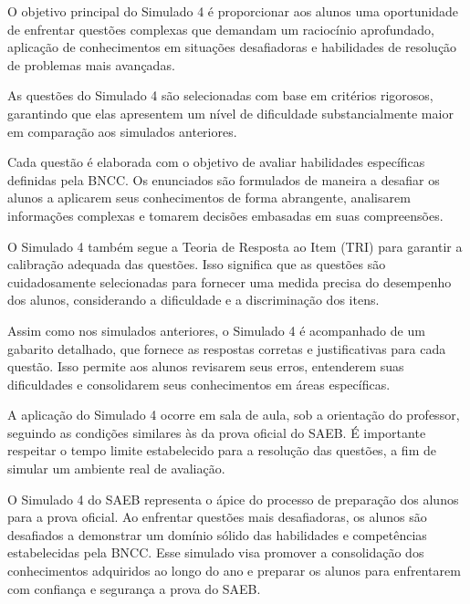 O objetivo principal do Simulado 4 é proporcionar aos alunos uma
oportunidade de enfrentar questões complexas que demandam um raciocínio
aprofundado, aplicação de conhecimentos em situações desafiadoras e
habilidades de resolução de problemas mais avançadas.

As questões do Simulado 4 são selecionadas com base em critérios
rigorosos, garantindo que elas apresentem um nível de dificuldade
substancialmente maior em comparação aos simulados anteriores.

Cada questão é elaborada com o objetivo de avaliar habilidades
específicas definidas pela BNCC. Os enunciados são formulados de maneira
a desafiar os alunos a aplicarem seus conhecimentos de forma abrangente,
analisarem informações complexas e tomarem decisões embasadas em suas
compreensões.

O Simulado 4 também segue a Teoria de Resposta ao Item (TRI) para
garantir a calibração adequada das questões. Isso significa que as
questões são cuidadosamente selecionadas para fornecer uma medida
precisa do desempenho dos alunos, considerando a dificuldade e a
discriminação dos itens.

Assim como nos simulados anteriores, o Simulado 4 é acompanhado de um
gabarito detalhado, que fornece as respostas corretas e justificativas
para cada questão. Isso permite aos alunos revisarem seus erros,
entenderem suas dificuldades e consolidarem seus conhecimentos em áreas
específicas.

A aplicação do Simulado 4 ocorre em sala de aula, sob a orientação do
professor, seguindo as condições similares às da prova oficial do SAEB.
É importante respeitar o tempo limite estabelecido para a resolução das
questões, a fim de simular um ambiente real de avaliação.

O Simulado 4 do SAEB representa o ápice do processo de preparação dos
alunos para a prova oficial. Ao enfrentar questões mais desafiadoras, os
alunos são desafiados a demonstrar um domínio sólido das habilidades e
competências estabelecidas pela BNCC. Esse simulado visa promover a
consolidação dos conhecimentos adquiridos ao longo do ano e preparar os
alunos para enfrentarem com confiança e segurança a prova do SAEB.
